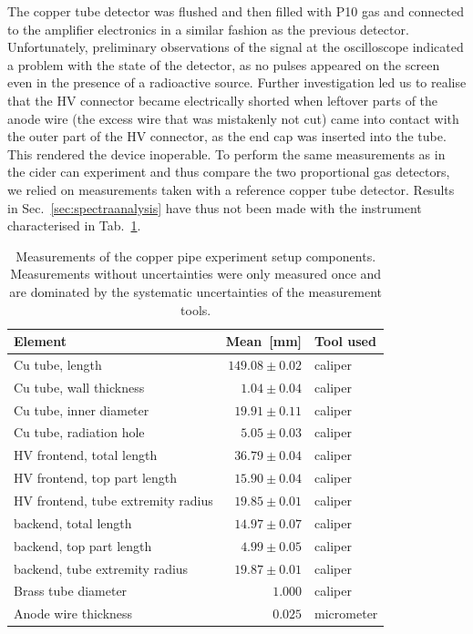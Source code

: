 The copper tube detector was flushed and then filled with P10 gas and connected to the amplifier electronics in a similar fashion as the previous detector. Unfortunately, preliminary observations of the signal at the oscilloscope indicated a problem with the state of the detector, as no pulses appeared on the screen even in the presence of a radioactive source. Further investigation led us to realise that the HV connector became electrically shorted when leftover parts of the anode wire (the excess wire that was mistakenly not cut) came into contact with the outer part of the HV connector, as the end cap was inserted into the tube. This rendered the device inoperable. To perform the same measurements as in the cider can experiment and thus compare the two proportional gas detectors, we relied on measurements taken with a reference copper tube detector.
Results in Sec.~\ref{sec:spectraanalysis} have thus not been made with the instrument characterised in Tab.~\ref{Tab:coppercan_sizes}.

\begin{table}[htb]
	\begin{tabularx}{\linewidth}{p{4cm}rp{2cm}}
		\textbf{Element}                   & \textbf{Mean}~{[}mm{]} & \textbf{Tool used} \\ \hline
		Cu tube, length                    & $149.08 \pm 0.02$      & caliper            \\
		Cu tube, wall thickness            & $1.04 \pm 0.04$        & caliper            \\
		Cu tube, inner diameter            & $19.91 \pm 0.11$       & caliper            \\
		Cu tube, radiation hole            & $5.05 \pm 0.03$        & caliper            \\
		HV frontend, total length          & $36.79 \pm 0.04$       & caliper            \\
		HV frontend, top part length       & $15.90 \pm 0.04$       & caliper            \\
		HV frontend, tube extremity radius & $19.85 \pm 0.01$       & caliper            \\
		backend, total length              & $14.97 \pm 0.07$       & caliper            \\
		backend, top part length           & $4.99 \pm 0.05$        & caliper            \\
		backend, tube extremity radius     & $19.87 \pm 0.01$       & caliper            \\
		Brass tube diameter                & $1.000$                & caliper            \\
		Anode wire thickness               & $0.025$                & micrometer         \\ \hline
	\end{tabularx}
\caption{Measurements of the copper pipe experiment setup components. Measurements without uncertainties were only measured once and are dominated by the systematic uncertainties of the measurement tools.}%
\label{Tab:coppercan_sizes}
\end{table}

